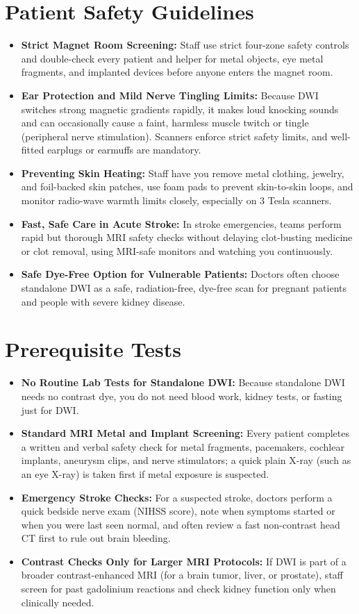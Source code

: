 \section{Patient Safety Guidelines}
\begin{itemize}
\item \textbf{Strict Magnet Room Screening:} Staff use strict four-zone safety controls and double-check every patient and helper for metal objects, eye metal fragments, and implanted devices before anyone enters the magnet room.
\item \textbf{Ear Protection and Mild Nerve Tingling Limits:} Because DWI switches strong magnetic gradients rapidly, it makes loud knocking sounds and can occasionally cause a faint, harmless muscle twitch or tingle (peripheral nerve stimulation). Scanners enforce strict safety limits, and well-fitted earplugs or earmuffs are mandatory.
\item \textbf{Preventing Skin Heating:} Staff have you remove metal clothing, jewelry, and foil-backed skin patches, use foam pads to prevent skin-to-skin loops, and monitor radio-wave warmth limits closely, especially on 3 Tesla scanners.
\item \textbf{Fast, Safe Care in Acute Stroke:} In stroke emergencies, teams perform rapid but thorough MRI safety checks without delaying clot-busting medicine or clot removal, using MRI-safe monitors and watching you continuously.
\item \textbf{Safe Dye-Free Option for Vulnerable Patients:} Doctors often choose standalone DWI as a safe, radiation-free, dye-free scan for pregnant patients and people with severe kidney disease.
\end{itemize}

\section{Prerequisite Tests}
\begin{itemize}
\item \textbf{No Routine Lab Tests for Standalone DWI:} Because standalone DWI needs no contrast dye, you do not need blood work, kidney tests, or fasting just for DWI.
\item \textbf{Standard MRI Metal and Implant Screening:} Every patient completes a written and verbal safety check for metal fragments, pacemakers, cochlear implants, aneurysm clips, and nerve stimulators; a quick plain X-ray (such as an eye X-ray) is taken first if metal exposure is suspected.
\item \textbf{Emergency Stroke Checks:} For a suspected stroke, doctors perform a quick bedside nerve exam (NIHSS score), note when symptoms started or when you were last seen normal, and often review a fast non-contrast head CT first to rule out brain bleeding.
\item \textbf{Contrast Checks Only for Larger MRI Protocols:} If DWI is part of a broader contrast-enhanced MRI (for a brain tumor, liver, or prostate), staff screen for past gadolinium reactions and check kidney function only when clinically needed.
\end{itemize}


